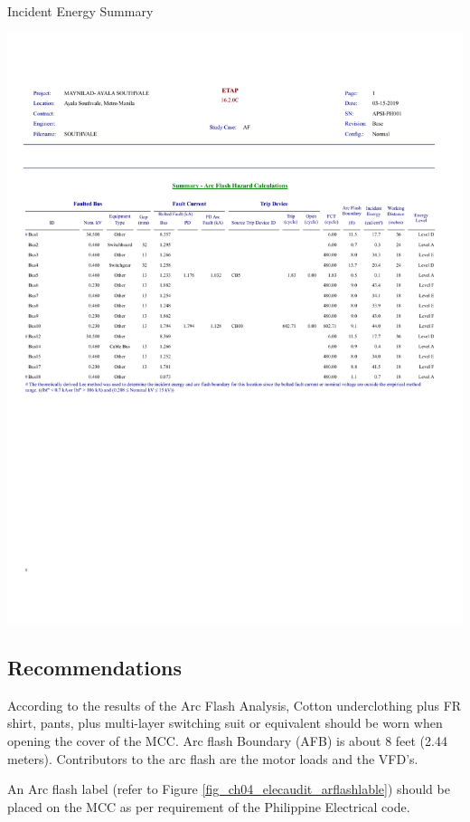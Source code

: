 \begin{table}
	\caption{Incident Energy Summary}
	\label{tbl_ch04_elecaudit_incidenenergysummary}
		\includegraphics[width=\textwidth]{tables/tbl_ch04_elecaudit_arcflashsummary} \\	
	
\end{table}


\subsection{Recommendations}
According to the results of the Arc Flash Analysis, Cotton underclothing plus FR shirt, pants, plus multi-layer switching suit or equivalent should be worn when opening the cover of the MCC. Arc flash Boundary (AFB)  is about 8 feet (2.44 meters).  Contributors to the arc flash are the motor loads and the VFD’s.

An Arc flash label (refer to Figure \ref{fig_ch04_elecaudit_arflashlable}) should be placed on the MCC as per requirement of the Philippine Electrical code.

